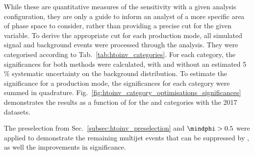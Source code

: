 While these are quantitative measures of the sensitivity with a given analysis configuration, they are only a guide to inform an analyst of a more specific area of phase space to consider, rather than providing a precise cut for the given variable. To derive the appropriate cut for each production mode, all simulated signal and background events were processed through the analysis. They were categorised according to Tab.~\ref{tab:htoinv_categories}. For each category, the significances for both methods were calculated, with and without an estimated 5\,\% systematic uncertainty on the background distribution. To estimate the significance for a production mode, the significances for each category were summed in quadrature. Fig.~\ref{fig:htoinv_category_optimisations_significances} demonstrates the results as a function of \omegaTilde for the \ttH and \VH categories with the 2017 datasets.

The preselection from Sec.~\ref{subsec:htoinv_preselection} and $\mindphi > \text{0.5}$ were applied to demonstrate the remaining multijet events that can be suppressed by \omegaTilde, as well the improvements in significance.

